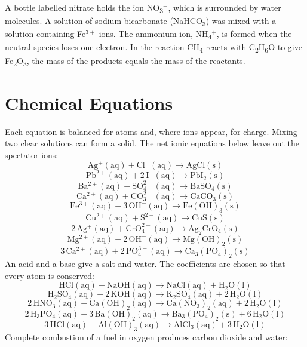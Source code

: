 \documentclass[11pt]{article}
\begin{document}
A bottle labelled nitrate holds the ion NO\textsubscript{3}$^{-}$, which is surrounded by water molecules. A solution of sodium bicarbonate (NaHCO\textsubscript{3}) was mixed with a solution containing Fe$^{3+}$ ions. The ammonium ion, NH\textsubscript{4}$^{+}$, is formed when the neutral species loses one electron. In the reaction CH\textsubscript{4} reacts with C\textsubscript{2}H\textsubscript{6}O to give Fe\textsubscript{2}O\textsubscript{3}, the mass of the products equals the mass of the reactants.
\section*{Chemical Equations}
Each equation is balanced for atoms and, where ions appear, for charge.
Mixing two clear solutions can form a solid. The net ionic equations below leave out the spectator ions:\nopagebreak
\label{eq020}\[
  \mathrm{Ag^+(aq)} + \mathrm{Cl^-(aq)} \longrightarrow \mathrm{AgCl(s)}
\]
\label{eq021}\[
  \mathrm{Pb^{2+}(aq)} + 2\,\mathrm{I^-(aq)} \longrightarrow \mathrm{PbI_2(s)}
\]
\label{eq022}\[
  \mathrm{Ba^{2+}(aq)} + \mathrm{SO_4^{2-}(aq)} \longrightarrow \mathrm{BaSO_4(s)}
\]
\label{eq023}\[
  \mathrm{Ca^{2+}(aq)} + \mathrm{CO_3^{2-}(aq)} \longrightarrow \mathrm{CaCO_3(s)}
\]
\label{eq024}\[
  \mathrm{Fe^{3+}(aq)} + 3\,\mathrm{OH^-(aq)} \longrightarrow \mathrm{Fe(OH)_3(s)}
\]
\label{eq025}\[
  \mathrm{Cu^{2+}(aq)} + \mathrm{S^{2-}(aq)} \longrightarrow \mathrm{CuS(s)}
\]
\label{eq026}\[
  2\,\mathrm{Ag^+(aq)} + \mathrm{CrO_4^{2-}(aq)} \longrightarrow \mathrm{Ag_2CrO_4(s)}
\]
\label{eq027}\[
  \mathrm{Mg^{2+}(aq)} + 2\,\mathrm{OH^-(aq)} \longrightarrow \mathrm{Mg(OH)_2(s)}
\]
\label{eq028}\[
  3\,\mathrm{Ca^{2+}(aq)} + 2\,\mathrm{PO_4^{3-}(aq)} \longrightarrow \mathrm{Ca_3(PO_4)_2(s)}
\]
An acid and a base give a salt and water. The coefficients are chosen so that every atom is conserved:\nopagebreak
\label{eq029}\[
  \mathrm{HCl(aq)} + \mathrm{NaOH(aq)} \longrightarrow \mathrm{NaCl(aq)} + \mathrm{H_2O(l)}
\]
\label{eq030}\[
  \mathrm{H_2SO_4(aq)} + 2\,\mathrm{KOH(aq)} \longrightarrow \mathrm{K_2SO_4(aq)} + 2\,\mathrm{H_2O(l)}
\]
\label{eq031}\[
  2\,\mathrm{HNO_3(aq)} + \mathrm{Ca(OH)_2(aq)} \longrightarrow \mathrm{Ca(NO_3)_2(aq)} + 2\,\mathrm{H_2O(l)}
\]
\label{eq032}\[
  2\,\mathrm{H_3PO_4(aq)} + 3\,\mathrm{Ba(OH)_2(aq)} \longrightarrow \mathrm{Ba_3(PO_4)_2(s)} + 6\,\mathrm{H_2O(l)}
\]
\label{eq033}\[
  3\,\mathrm{HCl(aq)} + \mathrm{Al(OH)_3(aq)} \longrightarrow \mathrm{AlCl_3(aq)} + 3\,\mathrm{H_2O(l)}
\]
Complete combustion of a fuel in oxygen produces carbon dioxide and water:\nopagebreak
\end{document}

